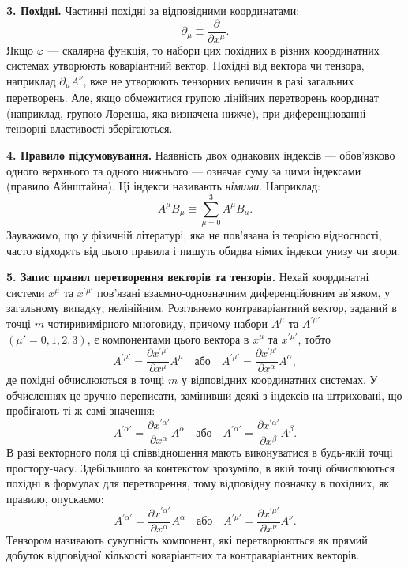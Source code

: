\textbf{3. Похідні.} Частинні похідні за відповідними координатами:
\[
  \partial_\mu \equiv \frac{\partial}{\partial x^\mu}.
\]
Якщо $\varphi$ --- скалярна функція, то набори цих похідних в різних
координатних системах утворюють коваріантний вектор. Похідні від вектора
чи тензора, наприклад $\partial_\mu A^\nu$, вже не утворюють тензорних
величин в разі загальних перетворень. Але, якщо обмежитися групою
лінійних перетворень координат (наприклад, групою Лоренца, яка визначена
нижче), при диференціюванні тензорні властивості зберігаються.

\textbf{4. Правило підсумовування.}
Наявність двох однакових індексів --- обов'язково одного верхнього та
одного нижнього --- означає суму за цими індексами (правило Айнштайна).
Ці індекси називають \textit{німими}. Наприклад:
\[
  A^\mu B_\mu \equiv \sum_{\mu=0}^{3} A^\mu B_\mu.
\]
Зауважимо, що у фізичній літературі, яка не пов'язана із
теорією відносності, часто відходять від цього правила і пишуть обидва
німих індекси унизу чи згори.

\textbf{5. Запис правил перетворення векторів та тензорів.}
Нехай координатні системи $x^\mu$ та $x^{\prime\mu'}$ пов'язані
взаємно-однозначним диференційовним зв'язком, у загальному випадку,
нелінійним. Розглянемо контраваріантний вектор, заданий в точці $m$
чотиривимірного многовиду, причому набори $A^\mu$ та $A^{\prime\mu'}$
$(\mu' = 0,1,2,3)$, є компонентами цього вектора в $x^\mu$ та
$x^{\prime\mu'}$, тобто
\[
  A^{\prime\mu'} = \frac{\partial x^{\prime\mu'}}{\partial x^\mu} A^\mu
  \quad\text{або}\quad
  A^{\prime\mu'} = \frac{\partial x^{\prime\mu'}}{\partial x^\alpha} A^\alpha,
\]
де похідні обчислюються в точці $m$ у відповідних координатних
системах. У обчисленнях це зручно переписати, замінивши деякі з індексів
на штриховані, що пробігають ті ж самі значення:
\[
  A^{\prime\alpha'} = \frac{\partial x^{\prime\alpha'}}{\partial x^\alpha} A^\alpha
  \quad\text{або}\quad
  A^{\prime\alpha'} = \frac{\partial x^{\prime\alpha'}}{\partial x^\beta} A^\beta.
\]
В разі векторного поля ці співвідношення мають виконуватися в будь-якій
точці простору-часу. Здебільшого за контекстом зрозуміло, в якій точці
обчислюються похідні в формулах для перетворення, тому відповідну
позначку в похідних, як правило, опускаємо:
\[
  A^{\prime\alpha'} = \frac{\partial x^{\prime\alpha'}}{\partial x^\alpha} A^\alpha
  \quad\text{або}\quad
  A^{\prime\mu'} = \frac{\partial x^{\prime\mu'}}{\partial x^\nu} A^\nu.
\]
Тензором називають сукупність компонент, які перетворюються як прямий
добуток відповідної кількості коваріантних та контраваріантних векторів.

